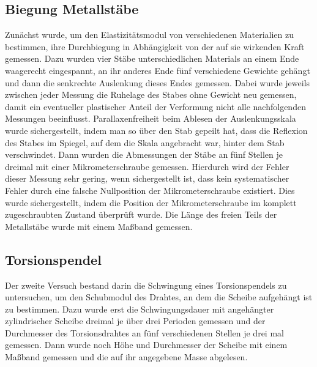 \documentclass[
	a4paper,
	12pt,
	pagesize,
	ngerman
]{scrartcl}
\begin{document}
	\subsection{Biegung Metallstäbe} %
	Zunächst wurde, um den Elastizitätsmodul von verschiedenen Materialien zu bestimmen, ihre Durchbiegung in Abhängigkeit von der auf sie wirkenden Kraft gemessen.
	Dazu wurden vier Stäbe unterschiedlichen Materials an einem Ende waagerecht eingespannt, an ihr anderes Ende fünf verschiedene Gewichte gehängt und dann die senkrechte Auslenkung dieses Endes gemessen.
	Dabei wurde jeweils zwischen jeder Messung die Ruhelage des Stabes ohne Gewicht neu gemessen, damit ein eventueller plastischer Anteil der Verformung nicht alle nachfolgenden Messungen beeinflusst. Parallaxenfreiheit beim Ablesen der Auslenkungsskala wurde sichergestellt, indem man so über den Stab gepeilt hat, dass die Reflexion des Stabes im Spiegel, auf dem die Skala angebracht war, hinter dem Stab verschwindet. %
	Dann wurden die Abmessungen der Stäbe an fünf Stellen je dreimal mit einer Mikrometerschraube  gemessen.
	Hierdurch wird der Fehler dieser Messung sehr gering, wenn sichergestellt ist, dass kein systematischer Fehler durch eine falsche Nullposition der Mikrometerschraube existiert.
	Dies wurde sichergestellt, indem die Position der Mikrometerschraube im komplett zugeschraubten Zustand überprüft wurde.
	Die Länge des freien Teils der Metallstäbe wurde mit einem Maßband gemessen.
	
	\subsection{Torsionspendel}
	Der zweite Versuch bestand darin die Schwingung eines Torsionspendels zu untersuchen, um den Schubmodul des Drahtes, an dem die Scheibe aufgehängt ist zu bestimmen.
	Dazu wurde erst die Schwingungsdauer mit angehängter zylindrischer Scheibe dreimal je über drei Perioden gemessen und der Durchmesser des Torsionsdrahtes an fünf verschiedenen Stellen je drei mal gemessen. Dann wurde noch Höhe und Durchmesser der Scheibe mit einem Maßband gemessen und die auf ihr angegebene Masse abgelesen.
\end{document}
